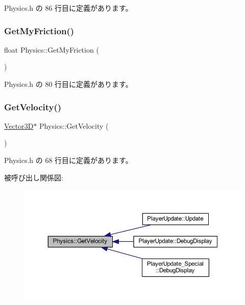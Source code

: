  Physics.\+h の 86 行目に定義があります。

\mbox{\label{class_physics_a50ad9d79f3b42a209a05f57557f294f0}} 
\subsubsection{\texorpdfstring{Get\+My\+Friction()}{GetMyFriction()}}
{\footnotesize\ttfamily float Physics\+::\+Get\+My\+Friction (\begin{DoxyParamCaption}{ }\end{DoxyParamCaption})\hspace{0.3cm}{\ttfamily [inline]}}



 Physics.\+h の 80 行目に定義があります。

\mbox{\label{class_physics_a8e33f600575e7ee5ad348d695a9eb45e}} 
\subsubsection{\texorpdfstring{Get\+Velocity()}{GetVelocity()}}
{\footnotesize\ttfamily \mbox{\hyperlink{class_vector3_d}{Vector3D}}$\ast$ Physics\+::\+Get\+Velocity (\begin{DoxyParamCaption}{ }\end{DoxyParamCaption})\hspace{0.3cm}{\ttfamily [inline]}}



 Physics.\+h の 68 行目に定義があります。

被呼び出し関係図\+:\nopagebreak
\begin{figure}[H]
\begin{center}
\leavevmode
\includegraphics[width=350pt]{class_physics_a8e33f600575e7ee5ad348d695a9eb45e_icgraph}
\end{center}
\end{figure}
\mbox{\label{class_physics_a666e85a519fcb5f350a1f42273842f4d}} 
